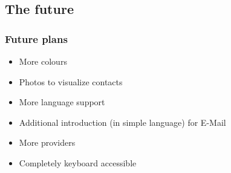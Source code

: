 \documentclass[9pt]{beamer}
\begin{document}
		\subsection{The future}
			\begin{frame}
				\frametitle{Future plans}
				\begin{itemize}
					\item More colours
					\item Photos to visualize contacts
					\item More language support
					\item Additional introduction (in simple language) for E-Mail
					\item More providers
					\item Completely keyboard accessible
				\end{itemize}
			
			\end{frame}
\end{document}
